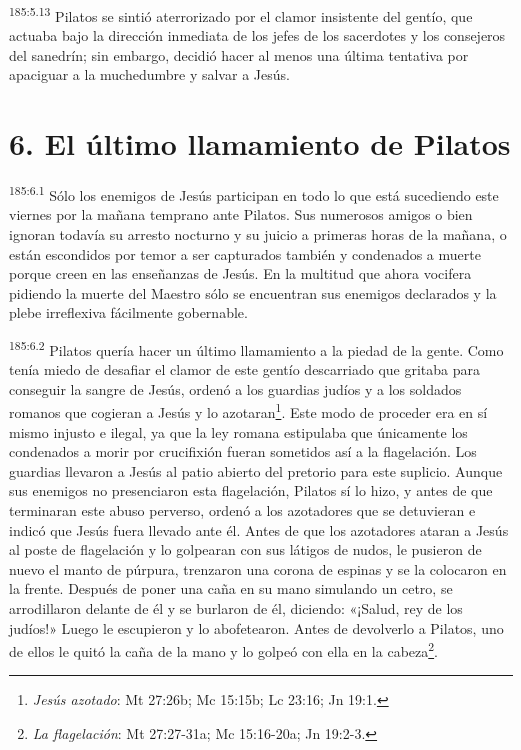 \par 
\textsuperscript{185:5.13} Pilatos se sintió aterrorizado por el clamor insistente del gentío, que actuaba bajo la dirección inmediata de los jefes de los sacerdotes y los consejeros del sanedrín; sin embargo, decidió hacer al menos una última tentativa por apaciguar a la muchedumbre y salvar a Jesús.

\section*{6. El último llamamiento de Pilatos}
\par 
\textsuperscript{185:6.1} Sólo los enemigos de Jesús participan en todo lo que está sucediendo este viernes por la mañana temprano ante Pilatos. Sus numerosos amigos o bien ignoran todavía su arresto nocturno y su juicio a primeras horas de la mañana, o están escondidos por temor a ser capturados también y condenados a muerte porque creen en las enseñanzas de Jesús. En la multitud que ahora vocifera pidiendo la muerte del Maestro sólo se encuentran sus enemigos declarados y la plebe irreflexiva fácilmente gobernable.

\par 
\textsuperscript{185:6.2} Pilatos quería hacer un último llamamiento a la piedad de la gente. Como tenía miedo de desafiar el clamor de este gentío descarriado que gritaba para conseguir la sangre de Jesús, ordenó a los guardias judíos y a los soldados romanos que cogieran a Jesús y lo azotaran\footnote{\textit{Jesús azotado}: Mt 27:26b; Mc 15:15b; Lc 23:16; Jn 19:1.}. Este modo de proceder era en sí mismo injusto e ilegal, ya que la ley romana estipulaba que únicamente los condenados a morir por crucifixión fueran sometidos así a la flagelación. Los guardias llevaron a Jesús al patio abierto del pretorio para este suplicio. Aunque sus enemigos no presenciaron esta flagelación, Pilatos sí lo hizo, y antes de que terminaran este abuso perverso, ordenó a los azotadores que se detuvieran e indicó que Jesús fuera llevado ante él. Antes de que los azotadores ataran a Jesús al poste de flagelación y lo golpearan con sus látigos de nudos, le pusieron de nuevo el manto de púrpura, trenzaron una corona de espinas y se la colocaron en la frente. Después de poner una caña en su mano simulando un cetro, se arrodillaron delante de él y se burlaron de él, diciendo: «¡Salud, rey de los judíos!» Luego le escupieron y lo abofetearon. Antes de devolverlo a Pilatos, uno de ellos le quitó la caña de la mano y lo golpeó con ella en la cabeza\footnote{\textit{La flagelación}: Mt 27:27-31a; Mc 15:16-20a; Jn 19:2-3.}.

